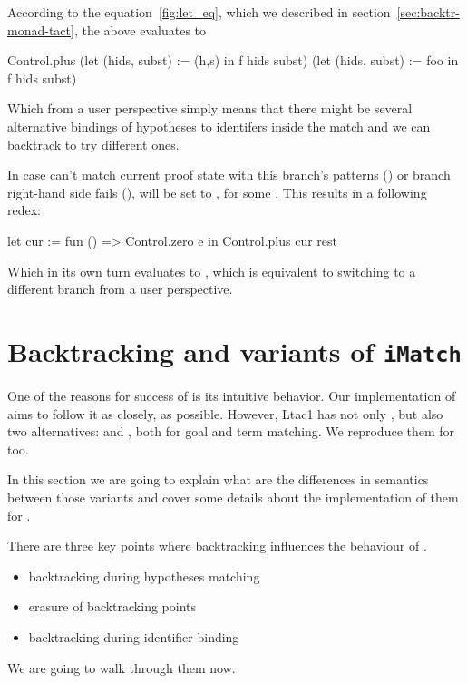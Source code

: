 According to the equation~\ref{fig:let_eq}, which we described in section~\ref{sec:backtr-monad-tact}, the above evaluates to
\begin{coq}
Control.plus
  (let (hids, subst) := (h,s) in
    f hids subst)
  (let (hids, subst) := foo in
   f hids subst)
\end{coq}

Which from a user perspective simply means that there might be several alternative bindings of hypotheses to identifers inside the match and we can backtrack to try different ones.

In case  can't match current proof state with this branch's patterns () or branch right-hand side fails (),  will be set to , for some .
This results in a following redex:
\begin{coq}
let cur := fun () => Control.zero e
in Control.plus cur rest
\end{coq}
Which in its own turn evaluates to , which is equivalent to switching to a different branch from a user perspective.

\section{Backtracking and variants of \texttt{iMatch}}

One of the reasons for success of  is its intuitive behavior.
Our implementation of  aims to follow it as closely, as possible.
However, Ltac1 has not only , but also two alternatives:  and , both for goal and term matching.
We reproduce them for  too.

In this section we are going to explain what are the differences in semantics between those variants and cover some details about the implementation of them for .

There are three key points where backtracking influences the behaviour of .
\begin{itemize}
\item backtracking during hypotheses matching
\item erasure of backtracking points
\item backtracking during identifier binding
\end{itemize}
We are going to walk through them now.

